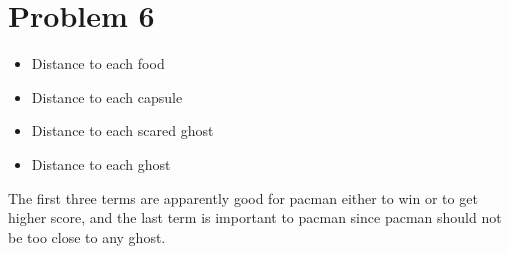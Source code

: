 \documentclass[12pt, a4paper]{article}
\begin{document}
\section*{Problem 6}
\begin{itemize}
  \item Distance to each food
  \item Distance to each capsule
  \item Distance to each scared ghost
  \item Distance to each ghost
\end{itemize}
The first three terms are apparently good for pacman either to win or to get
higher score, and the last term is important to pacman since pacman should not
be too close to any ghost.
\end{document}

